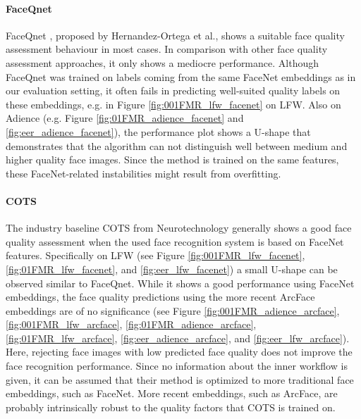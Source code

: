 \documentclass[10pt,twocolumn,letterpaper]{article}
\begin{document}
\paragraph{FaceQnet}
FaceQnet \cite{DBLP:journals/corr/abs-1904-01740}, proposed by Hernandez-Ortega et al., shows a suitable face quality assessment behaviour in most cases.
In comparison with other face quality assessment approaches, it only shows a mediocre performance.
Although FaceQnet was trained on labels coming from the same FaceNet embeddings as in our evaluation setting, it often fails in predicting well-suited quality labels on these embeddings, e.g. in Figure \ref{fig:001FMR_lfw_facenet} on LFW.
Also on Adience (e.g. Figure \ref{fig:01FMR_adience_facenet} and \ref{fig:eer_adience_facenet}), the performance plot shows a U-shape that demonstrates that the algorithm can not distinguish well between medium and higher quality face images.
Since the method is trained on the same features, these FaceNet-related instabilities might result from overfitting.

\paragraph{COTS}
The industry baseline COTS \cite{COTS} from Neurotechnology generally shows a good face quality assessment when the used face recognition system is based on FaceNet features.
Specifically on LFW (see Figure \ref{fig:001FMR_lfw_facenet}, \ref{fig:01FMR_lfw_facenet}, and \ref{fig:eer_lfw_facenet}) a small U-shape can be observed similar to FaceQnet.
While it shows a good performance using FaceNet embeddings, the face quality predictions using the more recent ArcFace embeddings are of no significance (see Figure \ref{fig:001FMR_adience_arcface}, \ref{fig:001FMR_lfw_arcface}, \ref{fig:01FMR_adience_arcface}, \ref{fig:01FMR_lfw_arcface}, \ref{fig:eer_adience_arcface}, and \ref{fig:eer_lfw_arcface}).
Here, rejecting face images with low predicted face quality does not improve the face recognition performance.
Since no information about the inner workflow is given, it can be assumed that their method is optimized to more traditional face embeddings, such as FaceNet.
More recent embeddings, such as ArcFace, are probably intrinsically robust to the quality factors that COTS is trained on.
\end{document}
